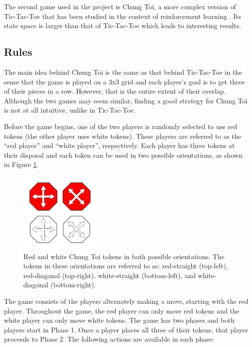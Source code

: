\documentclass[11pt,a4paper]{report}
\begin{document}
The second game used in the project is Chung Toi, a more complex version of Tic-Tac-Toe that has been studied in the context of reinforcement learning \cite{chung-toi-rl}. Its state space is larger than that of Tic-Tac-Toe which leads to interesting results.


\subsection{Rules}

The main idea behind Chung Toi \cite{chung-toi-rules} is the same as that behind Tic-Tac-Toe in the sense that the game is played on a 3x3 grid and each player's goal is to get three of their pieces in a row. However, that is the entire extent of their overlap. Although the two games may seem similar, finding a good strategy for Chung Toi is not at all intuitive, unlike in Tic-Tac-Toe.

Before the game begins, one of the two players is randomly selected to use red tokens (the other player uses white tokens). These players are referred to as the ``red player'' and ``white player'', respectively. Each player has three tokens at their disposal and each token can be used in two possible orientations, as shown in Figure \ref{chung-toi-tokens}.

\begin{figure}[htbp]
	\begin{center}
		\includegraphics[width=40mm]{chung_toi_tokens.png}
		\caption[Chung Toi tokens]{Red and white Chung Toi tokens in both possible orientations. The tokens in these orientations are referred to as: red-straight (top-left), red-diagonal (top-right), white-straight (bottom-left), and white-diagonal (bottom-right).}
		\label{chung-toi-tokens}
	\end{center}
\end{figure}

The game consists of the players alternately making a move, starting with the red player. Throughout the game, the red player can only move red tokens and the white player can only move white tokens. The game has two phases and both players start in Phase 1. Once a player places all three of their tokens, that player proceeds to Phase 2. The following actions are available in each phase:
\end{document}

